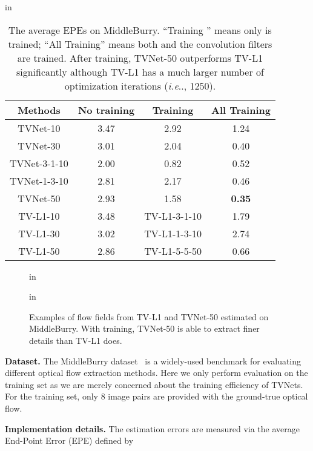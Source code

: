 \documentclass[10pt,twocolumn,letterpaper]{article}
\makeatletter
\DeclareRobustCommand\onedot{\futurelet\@let@token\@onedot}
\def\@onedot{\ifx\@let@token.\else.\null\fi\xspace}
\def\ie{\emph{i.e}\onedot} \def\Ie{\emph{I.e}\onedot}
\makeatother
\begin{document}
\begin{table}[t!]
 in
\centering
\caption{The average EPEs on MiddleBurry. ``Training '' means only  is trained; ``All Training'' means both  and the convolution filters are trained. After training, TVNet-50 outperforms TV-L1 significantly although TV-L1 has a much larger number of optimization iterations (\ie, 1250).}
\label{Tab:vs-tvl1}
\tabcolsep 4pt \renewcommand{\arraystretch}{0.8}
\begin{tabular}{c|c|c|c}
\toprule
Methods         & No training & Training  & All Training \\
\hline
TVNet-10        & 3.47  & 2.92  &  1.24   \\
TVNet-30        & 3.01  & 2.04  &  0.40  \\
TVNet-3-1-10    & 2.00  & 0.82  &  0.52 \\
TVNet-1-3-10    & 2.81  & 2.17  &  0.46   \\
TVNet-50        & 2.93  & 1.58  &  \textbf{0.35}    \\
\toprule
\toprule
TV-L1-10   & 3.48   &  TV-L1-3-1-10    & 1.79        \\
TV-L1-30   & 3.02   &  TV-L1-1-3-10    & 2.74     \\
TV-L1-50   & 2.86   &  TV-L1-5-5-50    & 0.66   \\
\bottomrule
\end{tabular}
\vskip -0.05in
\end{table}



\begin{figure}[t!]
 in
\begin{center}
 in
\caption{Examples of flow fields from TV-L1 and TVNet-50 estimated on MiddleBurry. With training, TVNet-50 is able to
extract finer details than TV-L1 does.}
\label{Fig:flow}
\end{center}
\end{figure}


\textbf{Dataset.}
The MiddleBurry dataset~\cite{baker2011database} is a widely-used benchmark for evaluating different optical flow extraction methods.
Here we only perform evaluation on the training set as we are merely concerned about the training efficiency of TVNets.
For the training set, only 8 image pairs are provided with the ground-true optical flow.

\textbf{Implementation details.}
The estimation errors are measured via the average End-Point Error (EPE) defined by
\end{document}
